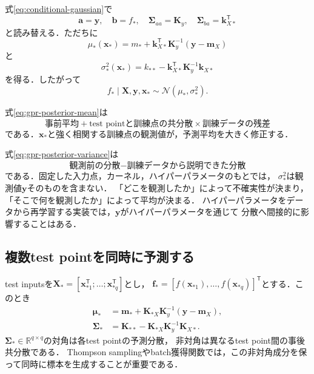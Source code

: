 \documentclass[a4paper,11pt]{ltjsarticle}
\newcommand{\R}{\mathbb R}
\newcommand{\N}{\mathcal N}
\newcommand{\T}{\mathsf T}
\begin{document}
式\eqref{eq:conditional-gaussian}で
\begin{equation*}
  \bm a=\bm y,
  \quad \bm b=f_*,
  \quad \bm\Sigma_{aa}=\bm K_y,
  \quad \bm\Sigma_{ba}=\bm k_{X*}^\T
\end{equation*}
と読み替える．ただちに
\begin{equation}
  \boxed{
  \mu_*(\bm x_*)
  =m_*+\bm k_{X*}^\T\bm K_y^{-1}(\bm y-\bm m_X)}
  \label{eq:gpr-posterior-mean}
\end{equation}
と
\begin{equation}
  \boxed{
  \sigma_*^2(\bm x_*)
  =k_{**}-\bm k_{X*}^\T\bm K_y^{-1}\bm k_{X*}}
  \label{eq:gpr-posterior-variance}
\end{equation}
を得る．したがって
\begin{equation}
  f_*\mid\bm X,\bm y,\bm x_*
  \sim\N(\mu_*,\sigma_*^2).
  \label{eq:gpr-posterior-scalar}
\end{equation}

\begin{intuitionbox}[事後平均]
式\eqref{eq:gpr-posterior-mean}は
\begin{equation*}
  \text{事前平均}
  +\text{test pointと訓練点の共分散}
  \times\text{訓練データの残差}
\end{equation*}
である．\(\bm x_*\)と強く相関する訓練点の観測値が，予測平均を大きく修正する．
\end{intuitionbox}

\begin{intuitionbox}[事後分散]
式\eqref{eq:gpr-posterior-variance}は
\begin{equation*}
  \text{観測前の分散}-\text{訓練データから説明できた分散}
\end{equation*}
である．固定した入力点，カーネル，ハイパーパラメータのもとでは，
\(\sigma_*^2\)は観測値\(\bm y\)そのものを含まない．
「どこを観測したか」によって不確実性が決まり，「そこで何を観測したか」によって平均が決まる．
ハイパーパラメータをデータから再学習する実装では，\(\bm y\)がハイパーパラメータを通じて
分散へ間接的に影響することはある．
\end{intuitionbox}

\subsection{複数test pointを同時に予測する}

test inputsを\(\bm X_*=[\bm x_{*1}^\T;\ldots;\bm x_{*q}^\T]\)とし，
\(\bm f_*=[f(\bm x_{*1}),\ldots,f(\bm x_{*q})]^\T\)とする．このとき
\begin{align}
  \bm\mu_*
  &=\bm m_*+\bm K_{*X}\bm K_y^{-1}(\bm y-\bm m_X),
  \label{eq:gpr-posterior-mean-multiple}\\
  \bm\Sigma_*
  &=\bm K_{**}-\bm K_{*X}\bm K_y^{-1}\bm K_{X*}.
  \label{eq:gpr-posterior-covariance-multiple}
\end{align}
\(\bm\Sigma_*\in\R^{q\times q}\)の対角は各test pointの予測分散，
非対角は異なるtest point間の事後共分散である．
Thompson samplingやbatch獲得関数では，この非対角成分を保って同時に標本を生成することが重要である．
\end{document}

